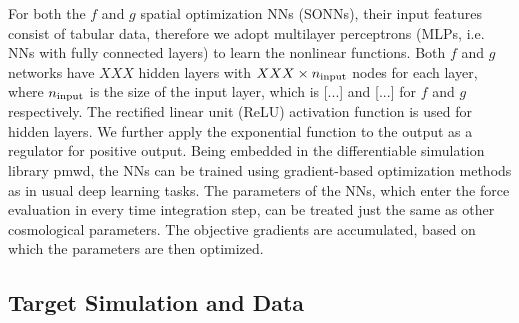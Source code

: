 \documentclass[modern, trackchanges, dvipsnames]{aastex631}
\newcommand{\pmwd}{{\usefont{T1}{nova}{m}{sl}pmwd}}
\begin{document}
For both the $f$ and $g$ spatial optimization NNs (SONNs), their input
features consist of tabular data, therefore we adopt multilayer
perceptrons (MLPs, i.e. NNs with fully connected layers) to learn the
nonlinear functions.
Both $f$ and $g$ networks have $XXX$ hidden layers with $XXX\times
n_{\rm input}$ nodes for each layer, where $n_{\rm input}$ is the size
of the input layer, which is [...] and [...] for $f$ and $g$
respectively.
The rectified linear unit (ReLU) activation function is used for hidden
layers.
We further apply the exponential function to the output as a regulator
for positive output.
Being embedded in the differentiable simulation library \pmwd, the NNs
can be trained using gradient-based optimization methods as in usual
deep learning tasks.
The parameters of the NNs, which enter the force evaluation in every
time integration step, can be treated just the same as other
cosmological parameters.
The objective gradients are accumulated, based on which the parameters
are then optimized.


\subsection{Target Simulation and Data}
\end{document}
